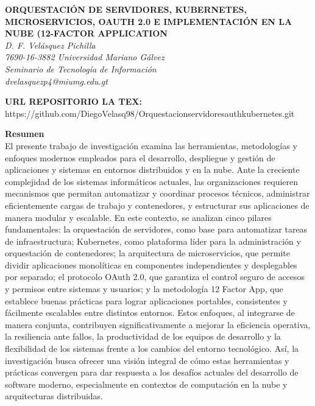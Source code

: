 \documentclass[12pt]{article}
\begin{document}
\begin{center}
    {\bfseries\uppercase{Orquestación de servidores, Kubernetes, Microservicios, OAuth 2.0 e Implementación en la nube (12-Factor Application}} \\
\textit{D. F. Velásquez Pichilla}\\
\textit{7690-16-3882 Universidad Mariano Gálvez}\\
\textit{Seminario de Tecnología de Información}\\
\textit{dvelasquezp4@miumg.edu.gt}\\
\end{center}

\textbf{URL REPOSITORIO LA TEX: } \\
https://github.com/DiegoVelasq98/Orquestacionservidoresauthkubernetes.git

\vspace{1em}
\noindent\textbf{Resumen}\\
El presente trabajo de investigación examina las herramientas, metodologías y enfoques modernos empleados para el desarrollo, despliegue y gestión de aplicaciones y sistemas en entornos distribuidos y en la nube. Ante la creciente complejidad de los sistemas informáticos actuales, las organizaciones requieren mecanismos que permitan automatizar y coordinar procesos técnicos, administrar eficientemente cargas de trabajo y contenedores, y estructurar sus aplicaciones de manera modular y escalable.
En este contexto, se analizan cinco pilares fundamentales: la orquestación de servidores, como base para automatizar tareas de infraestructura; Kubernetes, como plataforma líder para la administración y orquestación de contenedores; la arquitectura de microservicios, que permite dividir aplicaciones monolíticas en componentes independientes y desplegables por separado; el protocolo OAuth 2.0, que garantiza el control seguro de accesos y permisos entre sistemas y usuarios; y la metodología 12 Factor App, que establece buenas prácticas para lograr aplicaciones portables, consistentes y fácilmente escalables entre distintos entornos.
Estos enfoques, al integrarse de manera conjunta, contribuyen significativamente a mejorar la eficiencia operativa, la resiliencia ante fallos, la productividad de los equipos de desarrollo y la flexibilidad de los sistemas frente a los cambios del entorno tecnológico. Así, la investigación busca ofrecer una visión integral de cómo estas herramientas y prácticas convergen para dar respuesta a los desafíos actuales del desarrollo de software moderno, especialmente en contextos de computación en la nube y arquitecturas distribuidas.\\
\end{document}
